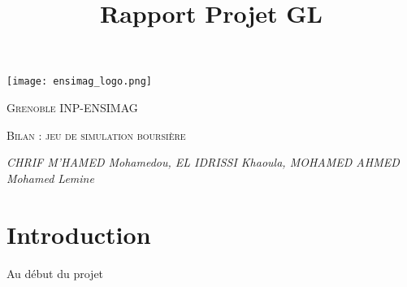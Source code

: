 \documentclass[10pt]{article}
\title{Rapport Projet GL}
\date{}
\author{}
\begin{document}
\large
\begin{titlepage}
    \centering
    \begin{minipage}{0.5\textwidth}
        \centering
        \texttt{[image: ensimag\_logo.png]}
    \end{minipage}

    
    {\scshape\LARGE Grenoble INP-ENSIMAG  \par}
    \vspace{4cm}
    {\scshape\Large  Bilan :  jeu de simulation boursière \par}
    \vspace{8cm}
    {\Large\itshape CHRIF M'HAMED Mohamedou, EL IDRISSI Khaoula, MOHAMED AHMED Mohamed Lemine
\par}



\end{titlepage}

\tableofcontents

\newpage
\section{\textbf{Introduction}}

Au début du projet 
\end{document}
